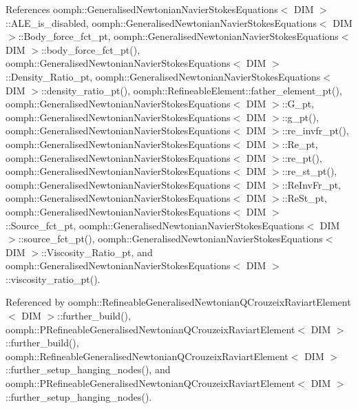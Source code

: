 References oomph\+::\+Generalised\+Newtonian\+Navier\+Stokes\+Equations$<$ D\+I\+M $>$\+::\+A\+L\+E\+\_\+is\+\_\+disabled, oomph\+::\+Generalised\+Newtonian\+Navier\+Stokes\+Equations$<$ D\+I\+M $>$\+::\+Body\+\_\+force\+\_\+fct\+\_\+pt, oomph\+::\+Generalised\+Newtonian\+Navier\+Stokes\+Equations$<$ D\+I\+M $>$\+::body\+\_\+force\+\_\+fct\+\_\+pt(), oomph\+::\+Generalised\+Newtonian\+Navier\+Stokes\+Equations$<$ D\+I\+M $>$\+::\+Density\+\_\+\+Ratio\+\_\+pt, oomph\+::\+Generalised\+Newtonian\+Navier\+Stokes\+Equations$<$ D\+I\+M $>$\+::density\+\_\+ratio\+\_\+pt(), oomph\+::\+Refineable\+Element\+::father\+\_\+element\+\_\+pt(), oomph\+::\+Generalised\+Newtonian\+Navier\+Stokes\+Equations$<$ D\+I\+M $>$\+::\+G\+\_\+pt, oomph\+::\+Generalised\+Newtonian\+Navier\+Stokes\+Equations$<$ D\+I\+M $>$\+::g\+\_\+pt(), oomph\+::\+Generalised\+Newtonian\+Navier\+Stokes\+Equations$<$ D\+I\+M $>$\+::re\+\_\+invfr\+\_\+pt(), oomph\+::\+Generalised\+Newtonian\+Navier\+Stokes\+Equations$<$ D\+I\+M $>$\+::\+Re\+\_\+pt, oomph\+::\+Generalised\+Newtonian\+Navier\+Stokes\+Equations$<$ D\+I\+M $>$\+::re\+\_\+pt(), oomph\+::\+Generalised\+Newtonian\+Navier\+Stokes\+Equations$<$ D\+I\+M $>$\+::re\+\_\+st\+\_\+pt(), oomph\+::\+Generalised\+Newtonian\+Navier\+Stokes\+Equations$<$ D\+I\+M $>$\+::\+Re\+Inv\+Fr\+\_\+pt, oomph\+::\+Generalised\+Newtonian\+Navier\+Stokes\+Equations$<$ D\+I\+M $>$\+::\+Re\+St\+\_\+pt, oomph\+::\+Generalised\+Newtonian\+Navier\+Stokes\+Equations$<$ D\+I\+M $>$\+::\+Source\+\_\+fct\+\_\+pt, oomph\+::\+Generalised\+Newtonian\+Navier\+Stokes\+Equations$<$ D\+I\+M $>$\+::source\+\_\+fct\+\_\+pt(), oomph\+::\+Generalised\+Newtonian\+Navier\+Stokes\+Equations$<$ D\+I\+M $>$\+::\+Viscosity\+\_\+\+Ratio\+\_\+pt, and oomph\+::\+Generalised\+Newtonian\+Navier\+Stokes\+Equations$<$ D\+I\+M $>$\+::viscosity\+\_\+ratio\+\_\+pt().



Referenced by oomph\+::\+Refineable\+Generalised\+Newtonian\+Q\+Crouzeix\+Raviart\+Element$<$ D\+I\+M $>$\+::further\+\_\+build(), oomph\+::\+P\+Refineable\+Generalised\+Newtonian\+Q\+Crouzeix\+Raviart\+Element$<$ D\+I\+M $>$\+::further\+\_\+build(), oomph\+::\+Refineable\+Generalised\+Newtonian\+Q\+Crouzeix\+Raviart\+Element$<$ D\+I\+M $>$\+::further\+\_\+setup\+\_\+hanging\+\_\+nodes(), and oomph\+::\+P\+Refineable\+Generalised\+Newtonian\+Q\+Crouzeix\+Raviart\+Element$<$ D\+I\+M $>$\+::further\+\_\+setup\+\_\+hanging\+\_\+nodes().

\mbox{\label{classoomph_1_1RefineableGeneralisedNewtonianNavierStokesEquations_a0f5691d4db49d42d411a6ec08d29c45e}} 
